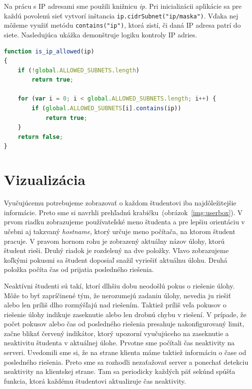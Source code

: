 Na prácu s IP adresami sme použili knižnicu \textit{ip}. Pri inicializácii
aplikácie sa pre každú povolenú sieť vytvorí inštancia
\verb'ip.cidrSubnet("ip/maska")'. Vďaka nej môžeme využiť metódu
\verb'contains("ip")', ktorá zistí, či daná IP adresa patrí do siete.
Nasledujúca ukážka demonštruje logiku kontroly IP adries.

\begin{lstlisting}[language=JavaScript]
function is_ip_allowed(ip)
{
    if (!global.ALLOWED_SUBNETS.length)
        return true;

    for (var i = 0; i < global.ALLOWED_SUBNETS.length; i++) {
        if (global.ALLOWED_SUBNETS[i].contains(ip))
            return true;
    }
    return false;
}
\end{lstlisting}

\section{Vizualizácia}
\label{sec:vizualization}

Vyučujúcemu potrebujeme zobrazovať o každom študentovi iba najdôležitejšie informácie.
Preto sme si navrhli prehľadnú \glqq krabičku\grqq ~(obrázok~\ref{img:userbox}).
V prvom riadku zobrazujeme používateľské meno študenta a pre lepšiu orientáciu
v učebni aj takzvaný \textit{hostname}, ktorý určuje meno počítača, na ktorom
študent pracuje. V pravom hornom rohu je zobrazený aktuálny názov úlohy, ktorú študent
rieši. Druhý riadok je rozdelený na dve položky. Vľavo zobrazujeme koľkými pokusmi
sa študent doposiaľ snažil vyriešiť aktuálnu úlohu. Druhá položka počíta čas od
prijatia posledného riešenia.

Neaktívni študenti sú takí, ktorí dlhšiu dobu neodošlú pokus o
riešenie úlohy. Môže to  byť zapríčinené tým, že nerozumejú zadaniu úlohy, nevedia ju
riešiť alebo len príliš dlho rozmýšľajú nad riešením. Taktiež príliš veľa pokusov
o riešenie úlohy indikuje zaseknutie alebo len drobnú chybu v riešení.
V prípade, že počet pokusov alebo čas od posledného
riešenia presahuje nakonfigurovaný limit, začne blikať červený indikátor, ktorý
upozorní vyučujúceho na zaseknutie a neaktivitu študenta v aktuálnej úlohe.
Prvotne sme počítali čas neaktivity na serveri. Uvedomili sme si, že na strane
klienta máme taktiež informáciu o čase od posledného riešenia. Preto sme sa rozhodli
nezaťažovať server a ponechať detekciu neaktivity na klientskej strane. Tam sa
periodicky každých päť sekúnd spúšťa funkcia, ktorá každému študentovi aktualizuje
čas neaktivity.

